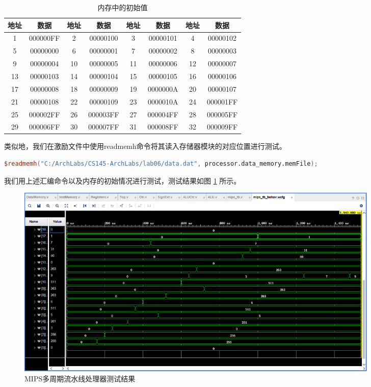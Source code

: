 \documentclass{cumcm}
\numberwithin{equation}{section}
\numberwithin{equation}{subsection}
\begin{document}
\begin{table}[htbp]
    \centering
    \begin{tabular}{|c|c|c|c|c|c|c|c|}
        \hline
        地址 & 数据 & 地址 & 数据& 地址 & 数据 & 地址 & 数据\\ \hline
        1 & 000000FF & 
        2 & 00000100 &
        3 & 00000101 & 
        4 & 00000102\\
        5 & 00000000 &
        6 & 00000001 &
        7 & 00000002 &
        8 & 00000003\\
        9 & 00000004 &
        10 & 00000005 &
        11 & 00000006 &
        12 & 00000007\\
        13 & 00000103 &
        14 & 00000104 &
        15 & 00000105 &
        16 & 00000106\\
        17 & 00000008 &
        18 & 00000009 &
        19 & 0000000A &
        20 & 00000107\\
        21 & 00000108 &
        22 & 00000109 &
        23 & 0000010A &
        24 & 000001FF\\
        25 & 000002FF &
        26 & 000003FF &
        27 & 000004FF &
        28 & 000005FF\\
        29 & 000006FF &
        30 & 000007FF &
        31 & 000008FF &
        32 & 000009FF\\
        \hline
    \end{tabular}
    \caption{内存中的初始值}
    \label{tab4}
\end{table}

类似地，我们在激励文件中使用readmemh命令将其读入存储器模块的对应位置进行测试。
\begin{lstlisting}[language=verilog]
$readmemh("C:/ArchLabs/CS145-ArchLabs/lab06/data.dat", processor.data_memory.memFile);         
\end{lstlisting}

我们用上述汇编命令以及内存的初始情况进行测试，测试结果如图 \ref{fig1} 所示。

\begin{figure}[htbp]
    \centering
    \includegraphics[width=7in]{1.png}
    \caption{MIPS多周期流水线处理器测试结果}
    \label{fig1}
\end{figure}
\end{document}
